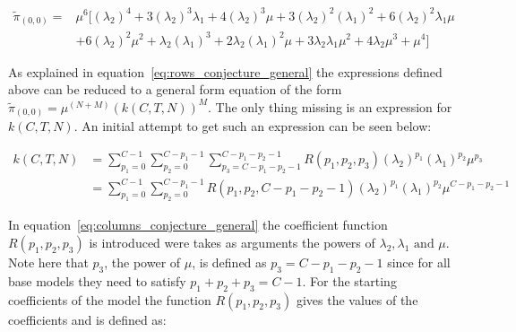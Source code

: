 \begin{figure}[H]
    \centering
    \scalebox{0.8}{
        }
\end{figure}
\begin{align}\label{eq:00_rate_1151}
    \tilde{\pi}_{(0,0)} =& \mu^6[(\lambda_2)^4 + 3(\lambda_2)^3 \lambda_1 +
    4(\lambda_2)^3 \mu + 3(\lambda_2)^2 (\lambda_1)^2 +
    6(\lambda_2)^2 \lambda_1 \mu \\
    & + 6(\lambda_2)^2 \mu^2 + \lambda_2 (\lambda_1)^3 +
    2\lambda_2 (\lambda_1)^2 \mu + 3\lambda_2 \lambda_1 \mu^2 +
    4\lambda_2 \mu^3 + \mu^4] \nonumber
\end{align}


As explained in equation~\eqref{eq:rows_conjecture_general} the expressions
defined above can be reduced to a general form equation of the form
\(\tilde{\pi}_{(0,0)} = \mu^{(N+M)} (k(C,T,N))^M\).
The only thing missing is an expression for \(k(C,T,N)\).
An initial attempt to get such an expression can be seen below:

\begin{align}\label{eq:columns_conjecture_general}
    k(C,T,N) &= \sum_{p_1=0}^{C-1} \sum_{p_2=0}^{C-p_1-1}
    \sum_{p_3=C - p_1 - p_2 - 1}^{C - p_1 - p_2 - 1} R(p_1, p_2, p_3)
    (\lambda_2)^{p_1} (\lambda_1)^{p_2} \mu^{p_3} \nonumber \\
    &= \sum_{p_1=0}^{C-1} \sum_{p_2=0}^{C-p_1-1} R(p_1, p_2, C-p_1-p_2-1)
    (\lambda_2)^{p_1} (\lambda_1)^{p_2} \mu^{C-p_1-p_2-1}
\end{align}

In equation~\eqref{eq:columns_conjecture_general} the coefficient function
\(R(p_1,p_2,p_3)\) is introduced were takes as arguments the powers of
\(\lambda_2, \lambda_1 \text{ and } \mu\).
Note here that \(p_3\), the power of \(\mu\), is defined as \(p_3=C-p_1-p_2-1\)
since for all base models they need to satisfy \(p_1 + p_2 + p_3 = C-1\).
For the starting coefficients of the model the function \(R(p_1,p_2,p_3)\) gives
the values of the coefficients and is defined as:

